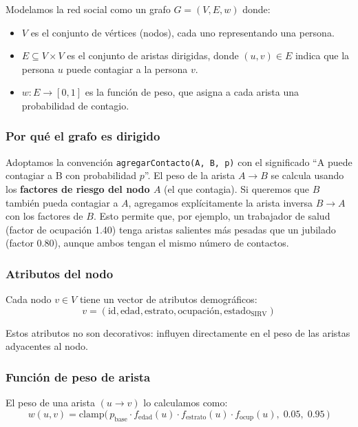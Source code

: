 \documentclass[spanish,notitlepage,letterpaper, 12pt]{article}
\begin{document}
Modelamos la red social como un grafo $G = (V, E, w)$ donde:

\begin{itemize}
    \item $V$ es el conjunto de v\'ertices (nodos), cada uno representando una persona.
    \item $E \subseteq V \times V$ es el conjunto de aristas dirigidas, donde $(u, v) \in E$ indica que la persona $u$ puede contagiar a la persona $v$.
    \item $w: E \rightarrow [0, 1]$ es la funci\'on de peso, que asigna a cada arista una probabilidad de contagio.
\end{itemize}

\subsubsection{Por qu\'e el grafo es dirigido}

Adoptamos la convenci\'on \texttt{agregarContacto(A, B, p)} con el significado ``A puede contagiar a B con probabilidad $p$''. El peso de la arista $A \rightarrow B$ se calcula usando los \textbf{factores de riesgo del nodo $A$} (el que contagia). Si queremos que $B$ tambi\'en pueda contagiar a $A$, agregamos expl\'icitamente la arista inversa $B \rightarrow A$ con los factores de $B$. Esto permite que, por ejemplo, un trabajador de salud (factor de ocupaci\'on 1.40) tenga aristas salientes m\'as pesadas que un jubilado (factor 0.80), aunque ambos tengan el mismo n\'umero de contactos.

\subsubsection{Atributos del nodo}

Cada nodo $v \in V$ tiene un vector de atributos demogr\'aficos:
\[
v = (\text{id}, \text{edad}, \text{estrato}, \text{ocupaci\'on}, \text{estado}_{\text{SIRV}})
\]

Estos atributos no son decorativos: influyen directamente en el peso de las aristas adyacentes al nodo.

\subsubsection{Funci\'on de peso de arista}

El peso de una arista $(u \rightarrow v)$ lo calculamos como:
\begin{equation}
w(u, v) = \text{clamp}\big( \, p_{\text{base}} \cdot f_{\text{edad}}(u) \cdot f_{\text{estrato}}(u) \cdot f_{\text{ocup}}(u), \; 0.05, \; 0.95 \, \big)
\label{eq:peso}
\end{equation}
\end{document}
